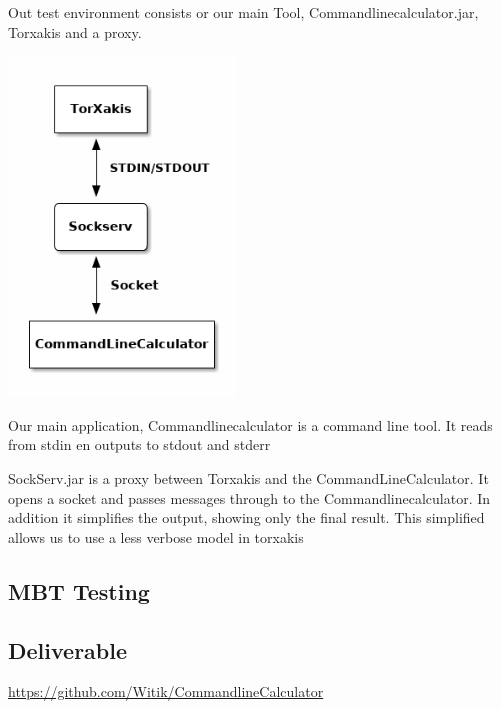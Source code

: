\documentclass[11pt,a4paper]{article}
\begin{document}
Out test environment consists or our main Tool,
Commandlinecalculator.jar, Torxakis and a proxy.

\includegraphics[width=6cm]{overview.png}

Our main application, Commandlinecalculator is a command line tool. It
reads from stdin en outputs to stdout and stderr

SockServ.jar is a proxy between Torxakis and the
CommandLineCalculator. It opens a socket and passes messages through
to the Commandlinecalculator. In addition it simplifies the output,
showing only the final result. This simplified allows us to use a less
verbose model in torxakis

\subsection{MBT Testing}

\subsection{Deliverable}

\url{https://github.com/Witik/CommandlineCalculator}
\end{document}
